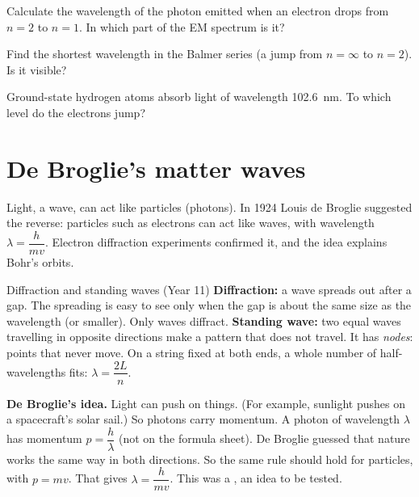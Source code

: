 \begin{quickcheck}
  \item Calculate the wavelength of the photon emitted when an electron drops from $n = 2$ to
        $n = 1$. In which part of the EM spectrum is it?
  \item Find the shortest wavelength in the Balmer series (a jump from $n = \infty$ to
        $n = 2$). Is it visible?
  \item Ground-state hydrogen atoms absorb light of wavelength \qty{102.6}{nm}. To which level
        do the electrons jump?
\end{quickcheck}

\section{De Broglie's matter waves}\label{ch3:sec:debroglie}

\begin{bigidea}
Light, a wave, can act like particles (photons). In 1924 Louis de Broglie suggested the
reverse: particles such as electrons can act like waves, with wavelength $\lambda =
\dfrac{h}{mv}$. Electron diffraction experiments confirmed it, and the idea explains Bohr's
orbits.
\end{bigidea}

\begin{keywords}
\end{keywords}

\begin{refresher}{Diffraction and standing waves (Year 11)}
\textbf{Diffraction:} a wave spreads out after a gap. The spreading is easy to see only when
the gap is about the same size as the wavelength (or smaller). Only waves diffract.
\textbf{Standing wave:} two equal waves travelling in opposite directions make a pattern that
does not travel. It has \emph{nodes}: points that never move. On a string fixed at both ends,
a whole number of half-wavelengths fits: $\lambda = \dfrac{2L}{n}$.
\end{refresher}

\textbf{De Broglie's idea.} Light can push on things. (For example, sunlight pushes on a
spacecraft's solar sail.) So photons carry momentum. A photon of wavelength $\lambda$ has
momentum $p = \dfrac{h}{\lambda}$ (not on the formula sheet). De Broglie guessed that nature
works the same way in both directions. So the same rule should hold for particles, with
$p = mv$. That gives $\lambda = \dfrac{h}{mv}$. This was a , an idea to be
tested.

